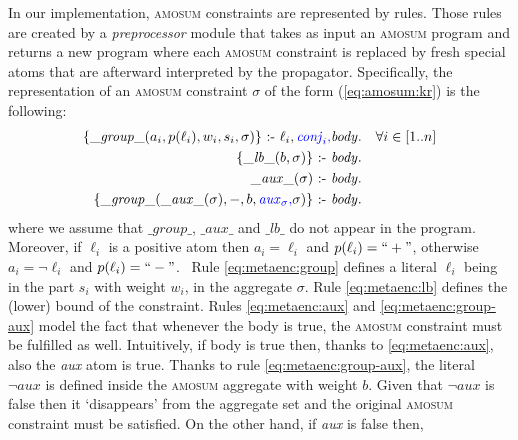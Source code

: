 \documentclass[preprint,authoryear]{elsarticle}
\theoremstyle{definition}
\def\amosum{\ensuremath{\textsc{amosum}}\xspace}
\begin{document}
In our implementation, \textsc{amosum} constraints are represented by rules. Those rules are created by a \textit{preprocessor} module that takes as input an \textsc{amosum} program and returns a new program where each \textsc{amosum} constraint is replaced by fresh special atoms that are afterward interpreted by the propagator. Specifically, the representation of an \textsc{amosum} constraint $\sigma$ of the form (\ref{eq:amosum:kr}) is the following:
\begin{align}
    \label{eq:metaenc:group}
    \{\mathit{\_group\_}(a_i, p(\ell_i), w_i, s_i, \sigma)\}\text{ :- } \ell_i, \textcolor{blue}{\mathit{conj}_i,} \mathit{body}. & \quad \forall i \in [1..n]\\ 
    \label{eq:metaenc:lb}
    \{\mathit{\_lb\_}(b, \sigma)\}\text{ :- } \mathit{body}. & \\
    \label{eq:metaenc:aux}
    \mathit{\_aux\_}(\sigma)\text{ :- } \mathit{body}. & \\
    \label{eq:metaenc:group-aux}
    \{\mathit{\_group\_}(\mathit{\_aux\_}(\sigma), -, b, \textcolor{blue}{\mathit{aux}_\sigma,} \sigma)\}\text{ :- } \mathit{body}. & 
\end{align}
where we assume that $\mathit{\_group\_}$, $\mathit{\_aux\_}$ and $\mathit{\_lb\_}$ do not appear in the program.
Moreover, if $\ell_i$ is a positive atom then $a_i = \ell_i$ and  $p(\ell_i) = ``+" $, otherwise $a_i = \lnot \ell_i$ and $p(\ell_i) = ``-" $.
\
Rule \eqref{eq:metaenc:group} defines a literal $\ell_i$ being in the part $s_i$ with weight $w_i$, in the aggregate $\sigma$.
Rule \eqref{eq:metaenc:lb} defines the (lower) bound
of the constraint.
Rules \eqref{eq:metaenc:aux} and \eqref{eq:metaenc:group-aux} model
the fact that whenever the body is true, the \textsc{amosum} constraint must be fulfilled as well. Intuitively, if body is true then, thanks to \eqref{eq:metaenc:aux}, also the \textit{aux} atom is true. Thanks to rule \eqref{eq:metaenc:group-aux}, the literal $\lnot \mathit{aux}$ is defined inside the \textsc{amosum} aggregate with weight $b$. Given that $\lnot \mathit{aux}$ is false then it `disappears' from the aggregate set and the original \textsc{amosum} constraint must be satisfied.
On the other hand, if \textit{aux} is false then,
\end{document}

